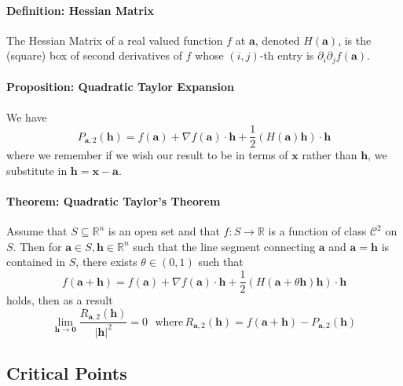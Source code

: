 \documentclass[12pt]{article}
\newcommand{\real}{\mathbb{R}}
\newcommand{\va}{\mathbf{a}}
\newcommand{\vx}{\mathbf{x}}
\newcommand{\vh}{\mathbf{h}}
\newcommand{\vzero}{\mathbf{0}}
\begin{document}
\paragraph{Definition: Hessian Matrix} The Hessian Matrix of a real valued function $f$ at $\va$, denoted $H(\va)$, is the (square) box of second derivatives of $f$ whose $(i,j)$-th entry is $\partial_i\partial_j f(\va)$.

\paragraph{Proposition: Quadratic Taylor Expansion} We have
\begin{equation*}
    P_{\va,2}(\vh) = f(\va) + \nabla f(\va)\cdot \vh + \frac{1}{2}(H(\va)\vh)\cdot \vh
\end{equation*}
where we remember if we wish our result to be in terms of $\vx$ rather than $\vh$, we substitute in $\vh = \vx - \va$.

\paragraph{Theorem: Quadratic Taylor's Theorem} Assume that $S\subseteq \real^n$ is an open set and that $f:S\to \real$ is a function of class $\mathcal{C}^2$ on $S$. Then for $\va\in S, \vh \in \real^n$ such that the line segment connecting $\va$ and $\va = \vh$ is contained in $S$, there exists $\theta\in (0,1)$ such that
\begin{equation*}
    f(\va + \vh) = f(\va)+\nabla f(\va)\cdot \vh + \frac{1}{2}(H(\va + \theta \vh)\vh)\cdot \vh
\end{equation*}
holds, then as a result
\begin{equation*}
    \lim_{\vh\to \vzero}\frac{R_{\va,2}(\vh)}{|\vh|^2} = 0\,\,\,\,\text{where}\,R_{\va,2}(\vh) = f(\va+\vh) - P_{\va,2}(\vh)
\end{equation*}

\subsection{Critical Points}
\end{document}
